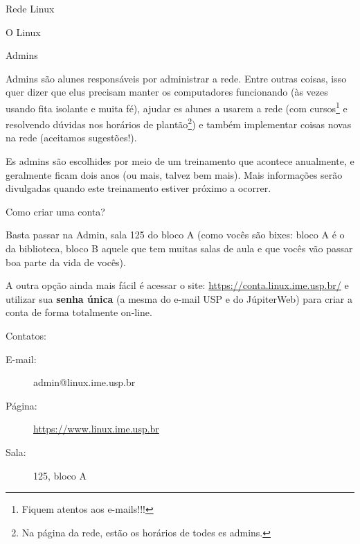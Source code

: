 \begin{subsecao}{Rede Linux}
\begin{subsubsecao}{O Linux}
\end{subsubsecao}

\begin{subsubsecao}{Admins}

Admins são alunes responsáveis por administrar a rede. Entre outras coisas,
isso quer dizer que elus precisam manter os computadores funcionando (às vezes usando fita isolante e muita fé), ajudar es alunes a
usarem a rede (com cursos\footnote{ Fiquem atentos aos e-mails!!!} e resolvendo
dúvidas nos horários de plantão\footnote{ Na página da rede, estão os horários
de todes es admins.}) e também implementar coisas novas na rede (aceitamos
sugestões!).

Es admins são escolhides por meio de um treinamento que acontece anualmente,
e geralmente ficam dois anos (ou mais, talvez bem mais).
Mais informações serão divulgadas quando este treinamento estiver próximo a ocorrer.

\end{subsubsecao}
\begin{subsubsecao}{Como criar uma conta?}

Basta passar na Admin, sala 125 do bloco A (como vocês são bixes: bloco A é o da
biblioteca, bloco B aquele que tem muitas salas de aula e que vocês vão passar boa
parte da vida de vocês).

A outra opção ainda mais fácil é acessar o site: \url{https://conta.linux.ime.usp.br/}
e utilizar sua \textbf{senha única} (a mesma do e-mail USP e do JúpiterWeb) para criar
a conta de forma totalmente on-line.

Contatos:

\vspace{-1em}

\begin{description}
\item [E-mail:] admin@linux.ime.usp.br
\item [Página:] \url{https://www.linux.ime.usp.br}
\item [Sala:] 125, bloco A
\end{description}

\vspace{-.5em}

\end{subsubsecao}

\end{subsecao}
